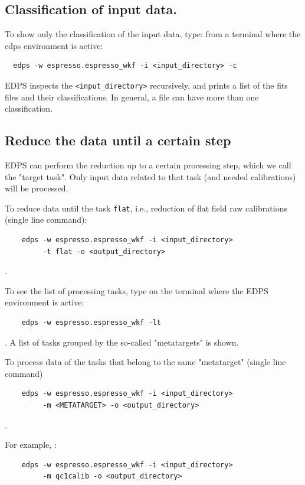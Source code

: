 \subsection{Classification of input data.}
\label{sec:edps_classification}
To show only the classification of the input data, type:
 from a terminal where the edps environment is active:
\begin{verbatim}
  edps -w espresso.espresso_wkf -i <input_directory> -c
\end{verbatim}

EDPS inspects the {\tt <input\_directory>} recursively, and prints a list of the fits files and their classifications. In general, a file can have more than one classification.


\subsection{Reduce the data until a certain step}
\label{sec:edps_target}

EDPS can perform the reduction up to a certain processing step, which we call the "target task". Only input data related to that task (and needed calibrations) will be processed.

To reduce data until the task {\tt flat}, i.e., reduction of flat field raw calibrations (single line command):
\begin{verbatim}
    edps -w espresso.espresso_wkf -i <input_directory> 
         -t flat -o <output_directory> 
\end{verbatim}.

To see the list of processing tasks, type on the terminal where the EDPS environment is active: 
\begin{verbatim}
    edps -w espresso.espresso_wkf -lt
\end{verbatim}. 
A list of tasks grouped by the so-called "metatargets" is shown.


To process data of the tasks that belong to the same "metatarget" (single line command)
\begin{verbatim}
    edps -w espresso.espresso_wkf -i <input_directory>
         -m <METATARGET> -o <output_directory>
\end{verbatim}. 

For example, :
\begin{verbatim}
    edps -w espresso.espresso_wkf -i <input_directory>
         -m qc1calib -o <output_directory> 
\end{verbatim}

